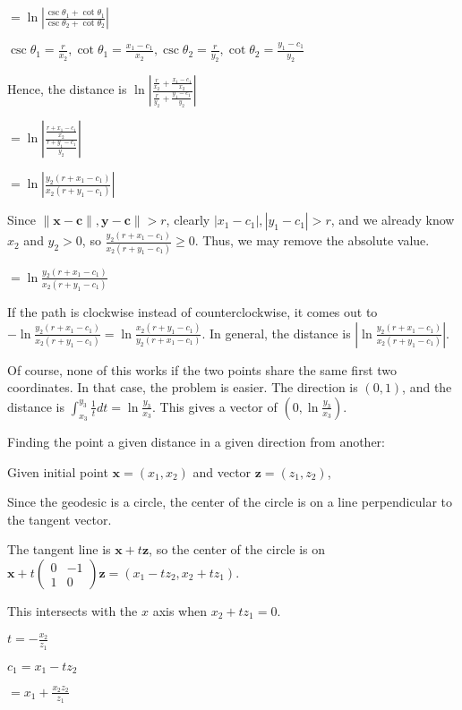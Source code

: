 \documentclass[12pt]{amsart}
\newcommand{\mat}[4]{\left(\begin{array}{ccc} #1 & #2 \\#3 & #4 \end{array} \right)}
\begin{document}
$= \ln\left|\frac{\csc\theta_1+\cot\theta_1}{\csc\theta_2+\cot\theta_2}\right|$

$\csc\theta_1 = \frac{r}{x_2}, \cot\theta_1 = \frac{x_1-c_1}{x_2}, \csc\theta_2 = \frac{r}{y_2}, \cot\theta_2 = \frac{y_1-c_1}{y_2}$

Hence, the distance is $\ln\left|\frac{\frac{r}{x_2}+\frac{x_1-c_1}{x_2}}{\frac{r}{y_2}+\frac{y_1-c_1}{y_2}}\right|$

$= \ln\left|\frac{\frac{r+x_1-c_1}{x_2}}{\frac{r+y_1-c_1}{y_2}}\right|$

$= \ln\left|\frac{y_2(r+x_1-c_1)}{x_2(r+y_1-c_1)}\right|$

Since $\|\textbf{x}-\textbf{c}\|, \textbf{y}-\textbf{c}\| > r$, clearly $|x_1-c_1|, |y_1-c_1| > r$, and we already know $x_2$ and $y_2 > 0$, so $\frac{y_2(r+x_1-c_1)}{x_2(r+y_1-c_1)} \geq 0$. Thus, we may remove the absolute value.

$= \ln\frac{y_2(r+x_1-c_1)}{x_2(r+y_1-c_1)}$

If the path is clockwise instead of counterclockwise, it comes out to $-\ln\frac{y_2(r+x_1-c_1)}{x_2(r+y_1-c_1)} = \ln\frac{x_2(r+y_1-c_1)}{y_2(r+x_1-c_1)}$. In general, the distance is $\left|\ln\frac{y_2(r+x_1-c_1)}{x_2(r+y_1-c_1)}\right|$.

Of course, none of this works if the two points share the same first two coordinates. In that case, the problem is easier. The direction is $(0,1)$, and the distance is $\int_{x_3}^{y_3} \frac{1}{t} dt = \ln\frac{y_3}{x_3}$. This gives a vector of $(0,\ln\frac{y_3}{x_3})$.

\bigskip

Finding the point a given distance in a given direction from another:

\bigskip

Given initial point $\textbf{x} = (x_1,x_2)$ and vector $\textbf{z} = (z_1,z_2)$,

Since the geodesic is a circle, the center of the circle is on a line perpendicular to the tangent vector.

The tangent line is $\textbf{x}+t\textbf{z}$, so the center of the circle is on $\textbf{x}+t\mat{0}{-1}{1}{0}\textbf{z} = (x_1-tz_2,x_2+tz_1)$.

This intersects with the $x$ axis when $x_2+tz_1 = 0$.

$t = -\frac{x_2}{z_1}$

$c_1 = x_1-tz_2$

$= x_1+\frac{x_2z_2}{z_1}$

\end{document}
